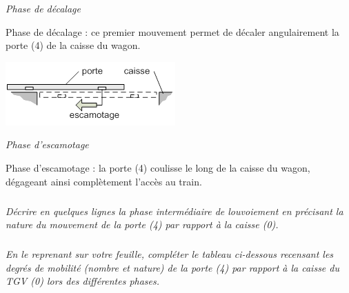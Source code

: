 \documentclass[10pt]{article}
\begin{document}
{\begin{minipage}[c]{.47\linewidth}
\begin{center}
\textit{Phase de décalage}%
\end{center}

\end{minipage}\hfill
\begin{minipage}[c]{.47\linewidth}
Phase de décalage : ce premier mouvement permet de décaler angulairement la porte (4) de la caisse du wagon.
\end{minipage}

\begin{minipage}[c]{.47\linewidth}
\begin{center}
\includegraphics[width=.8\textwidth]{images/fig_05}

\textit{Phase d'escamotage}
\end{center}
\end{minipage}\hfill
\begin{minipage}[c]{.47\linewidth}
Phase d’escamotage : la porte (4) coulisse le long de la caisse du wagon, dégageant ainsi complètement l’accès au train.
\end{minipage}
}

\subparagraph{}
\textit{Décrire en quelques lignes la phase intermédiaire de louvoiement en précisant la nature du mouvement de la porte (4) par rapport à la caisse (0).}


\subparagraph{}
\textit{En le reprenant sur votre feuille, compléter le tableau ci-dessous recensant les degrés de mobilité (nombre et nature) de la porte (4) par rapport à la caisse du TGV (0) lors des différentes phases.}
\end{document}
